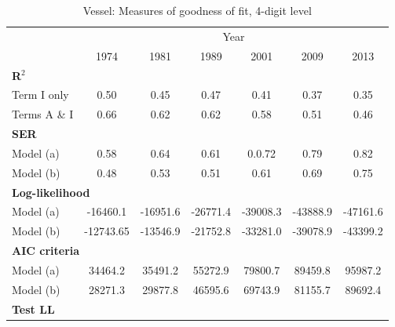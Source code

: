 \documentclass[a4paper,11pt]{article}
\begin{document}
\begin{table}[htbp]
  \centering
  \caption{Vessel: Measures of goodness of fit, 4-digit level}
\begin{center}
\label{tab:good_fit_ves_rob}%
  \footnotesize{
\begin{tabular}{l|cccccc}
\hline
\hline
      & \multicolumn{6}{c}{Year}                   \\
      & \multicolumn{1}{c}{1974} & \multicolumn{1}{c}{1981} & \multicolumn{1}{c}{1989} & \multicolumn{1}{c}{2001} & \multicolumn{1}{c}{2009} & \multicolumn{1}{c}{2013}  \\ \hline
\multicolumn{7}{l}{\textbf{R$^{2}$}} \\ \hline
Term I only & 0.50  & 0.45  & \multicolumn{1}{c}{0.47} & \multicolumn{1}{c}{0.41} & \multicolumn{1}{c}{0.37} & \multicolumn{1}{c}{0.35} \\
Terms A \& I & 0.66  & 0.62  & \multicolumn{1}{c}{0.62} & \multicolumn{1}{c}{0.58} & \multicolumn{1}{c}{0.51} & \multicolumn{1}{c}{0.46} \\ \hline
\multicolumn{7}{l}{\textbf{SER} }\\ \hline
Model (a) &    0.58   &   0.64    & \multicolumn{1}{c}{0.61} & \multicolumn{1}{c}{0.0.72} & \multicolumn{1}{c}{0.79} & \multicolumn{1}{c}{0.82} \\
Model (b) &   0.48    &    0.53   & \multicolumn{1}{c}{0.51} & \multicolumn{1}{c}{0.61} & \multicolumn{1}{c}{0.69} & \multicolumn{1}{c}{0.75} \\ \hline
\multicolumn{7}{l}{\textbf{Log-likelihood} } \\ \hline
Model (a)& -16460.1 & -16951.6 & \multicolumn{1}{c}{-26771.4} & \multicolumn{1}{c}{-39008.3} & \multicolumn{1}{c}{-43888.9} & \multicolumn{1}{c}{-47161.6} \\
Model (b) & -12743.65 & -13546.9 & \multicolumn{1}{c}{-21752.8} & \multicolumn{1}{c}{-33281.0} & \multicolumn{1}{c}{-39078.9} & \multicolumn{1}{c}{-43399.2}  \\ \hline
\multicolumn{7}{l}{\textbf{AIC criteria} } \\ \hline
Model (a) & 34464.2 & 35491.2 & \multicolumn{1}{c}{55272.9} & \multicolumn{1}{c}{79800.7} & \multicolumn{1}{c}{89459.8} & \multicolumn{1}{c}{95987.2}\\
Model (b) & 28271.3 & 29877.8 & \multicolumn{1}{c}{46595.6} & \multicolumn{1}{c}{69743.9} & \multicolumn{1}{c}{81155.7} & \multicolumn{1}{c}{89692.4} \\ \hline
\multicolumn{7}{l}{\textbf{Test LL}} \\ \hline

\end{tabular}}
\end{center}
\end{table}
\end{document}

